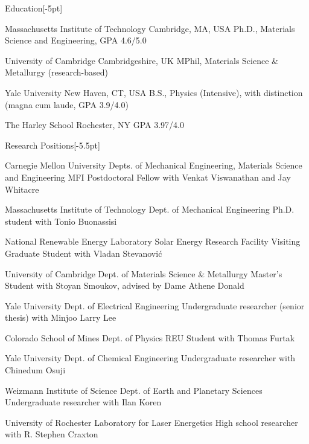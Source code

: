\documentclass{cv} %
\begin{document}
\thispagestyle{empty}
\begin{cvSection}{Education}[-5pt]

     {Massachusetts Institute of Technology}
     {Cambridge, MA, USA}
     {Ph.D., Materials Science and Engineering, GPA 4.6/5.0}
     
     {University of Cambridge}
     {Cambridgeshire, UK}
     {MPhil, Materials Science \& Metallurgy (research-based)}
     
     {Yale University}
     {New Haven, CT, USA}
     {B.S., Physics (Intensive), with distinction (magna cum laude, GPA 3.9/4.0)}
     
     {The Harley School}
     {Rochester, NY}
     {GPA 3.97/4.0}

\end{cvSection}

\begin{cvSection}{Research Positions}[-5.5pt]

    {Carnegie Mellon University}
    {Depts. of Mechanical Engineering, Materials \newline Science and Engineering}
    {MFI Postdoctoral Fellow with Venkat Viswanathan and Jay Whitacre}
    
    {Massachusetts Institute of Technology}
    {Dept. of Mechanical Engineering}
    {Ph.D. student with Tonio Buonassisi}
    
    {National Renewable Energy Laboratory}
    {Solar Energy Research Facility}
    {Visiting Graduate Student with Vladan Stevanovi\'c}
    
    {University of Cambridge}
    {Dept. of Materials Science \& Metallurgy}
    {Master's Student with Stoyan Smoukov, advised by Dame Athene Donald}
    
    {Yale University}
    {Dept. of Electrical Engineering}
    {Undergraduate researcher (senior thesis) with Minjoo Larry Lee}
    
    {Colorado School of Mines}
    {Dept. of Physics}
    {REU Student with Thomas Furtak}
    
    {Yale University}
    {Dept. of Chemical Engineering}
    {Undergraduate researcher with Chinedum Osuji}
    
    {Weizmann Institute of Science}
    {Dept. of Earth and Planetary Sciences}
    {Undergraduate researcher with Ilan Koren}
    
    {University of Rochester}
    {Laboratory for Laser Energetics}
    {High school researcher with R. Stephen Craxton}

\end{cvSection}
\end{document}
